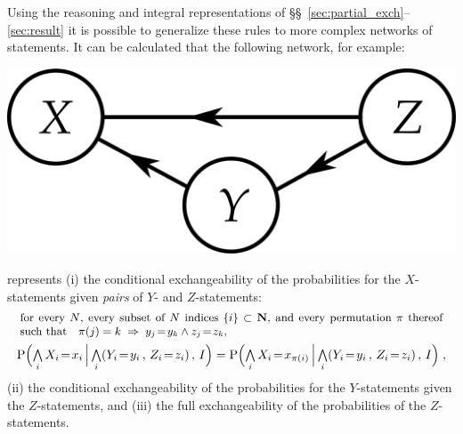 \documentclass[\ifafour a4paper,12pt,\else a5paper,10pt,\fi%
onecolumn,oneside,article,%
british%
]{memoir}
\theoremstyle{remark}
\theoremstyle{innote}
\newcommand*{\NN}{\bm{\mathrm{N}}}
\newcommand*{\Land}{\mathop{\textstyle\bigwedge}}
\DeclarePairedDelimiter\set{\{}{\}}
\newcommand*{\p}{\mathrm{P}}%
\renewcommand*{\|}[1][]{\nonscript\,#1\vert\nonscript\,\mathopen{}}
\newcommand*{\sects}{\S\S}%
\newcommand*{\mathbox}[2][.8]{\parbox[b]{#1\columnwidth}{#2}}
\newcommand*{\eq}{\mathrel{\!=\!}}
\renewcommand*{\=}{\TextOrMath\texteq\eq}
\newcommand*{\X}[1]{X_{#1}}
\newcommand*{\x}[1]{x_{#1}}
\newcommand*{\Y}[1]{Y_{#1}}
\newcommand*{\y}[1]{y_{#1}}
\newcommand*{\Z}[1]{Z_{#1}}
\newcommand*{\z}[1]{z_{#1}}
\begin{document}
Using the reasoning and integral representations of
\sects~\ref{sec:partial_exch}--\ref{sec:result} it is possible to
generalize these rules to more complex networks of statements. It can be
calculated that the following network, for example:
\begin{center}%
\includegraphics[scale=0.5]{bayesnet3.png}
\figcaption{\label{fig:dep3net}}  
\end{center}%
represents (i) the conditional exchangeability of the probabilities for the
$X$-statements given \emph{pairs} of $Y$- and $Z$-statements:
\begin{multline}
  \label{eq:part_exchangeableAB}
  \mathbox[0.99]{\small for every $N$, every subset of $N$ indices $\set{i}
    \subset \NN$, and every permutation $\pi$ thereof such that\quad
    $\pi(j)=k \mathrel{\;\Rightarrow\;} \y{j}\eq\y{k}\land \z{j}\eq\z{k}$,}
  \\
  \p\Bigl( \Land_{i}\X{i}\=\x{i}  \|[\Big]
  \Land_{i}(\Y{i}\=\y{i}\,,\,\Z{i}\=\z{i}) \,,\,    I\Bigr) =
  \p\Bigl( \Land_{i}\X{i}\=\x{\pi(i)}  \|[\Big]
  \Land_{i}(\Y{i}\=\y{i}\,,\,\Z{i}\=\z{i}) \,,\, I\Bigr)
  \;,
\end{multline}
(ii) the conditional exchangeability of the probabilities for the
$Y$-statements given the $Z$-statements, 
and (iii) the full exchangeability of the probabilities of the
$Z$-statements.
\end{document}
